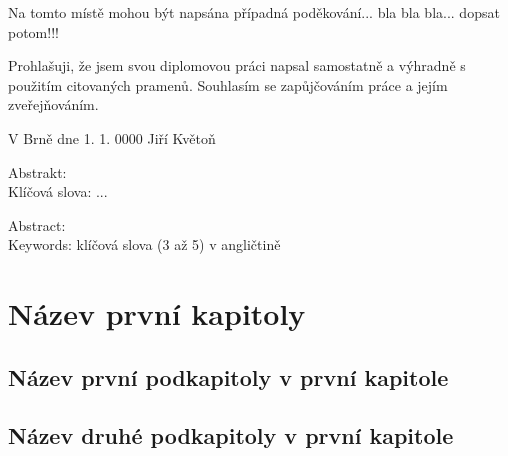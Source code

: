 \documentclass[12pt,notitlepage]{report}
\begin{document}
\normalsize 
\setcounter{page}{3}
\vspace{10mm}

\noindent Na tomto místě mohou být napsána případná poděkování... bla bla bla... dopsat potom!!!

\vspace{\fill}
\noindent Prohlašuji, že jsem svou diplomovou práci napsal samostatně a výhradně s použitím citovaných pramenů.
 Souhlasím se zapůjčováním práce a jejím zveřejňováním.

\bigskip
\noindent V Brně dne 1. 1. 0000 \hspace{\fill}Jiří Květoň
\newpage

%
%
\noindent
\noindent Abstrakt:
\noindent \\
\noindent Klíčová slova: ... 
\vspace{10mm}

\noindent Abstract: 
\noindent \\
\noindent Keywords: klíčová slova (3 až 5) v angličtině
\newpage

%
%
\tableofcontents
\newpage

%
%
\chapter{Název první kapitoly}
\section{Název první podkapitoly v první kapitole}
\section{Název druhé podkapitoly v první kapitole}



\begin{thebibliography}{99}
\end{thebibliography}
\end{document}
